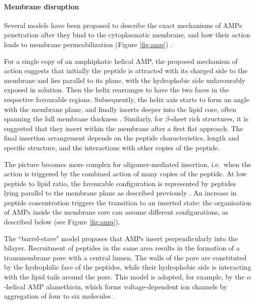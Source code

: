 \paragraph{Membrane disruption} Several models have been proposed to describe the exact mechanisms of AMPs penetration after they bind to the cytoplasmatic membrane, and how their action leads to membrane permeabilization (Figure \ref{fig:amp}) \citep{Brogden2005,Nguyen2011}.

For a single copy of an amphiphatic helical AMP, the proposed mechanism of action suggests that initially the peptide is attracted with its charged side to the membrane and lies parallel to its plane, with the hydrophobic side unfavourably exposed in solution. Then the helix rearranges to have the two faces in the respective favourable regions. Subsequently, the helix axis starts to form an angle with the membrane plane, and finally inserts deeper into the lipid core, often spanning the full membrane thickness \citep{Ebenhan2014}.
%
Similarly, for $\beta$-sheet rich structures, it is suggested that they insert within the membrane after a first flat approach.
%
The final insertion arrangement depends on the peptide characteristics, length and specific structure, and the interactions with other copies of the peptide.

The picture becomes more complex for oligomer-mediated insertion, i.e.\ when the action is triggered by the combined action of many copies of the peptide.
%
At low peptide to lipid ratio, the favourable configuration is represented by peptides lying parallel to the membrane plane as described previously \citep{Yang2001}. An increase in peptide concentration triggers the transition to an inserted state: the organisation of AMPs inside the membrane core can assume different configurations, as described below \citep{Brogden2005,Nguyen2011,Ebenhan2014,Mahlapuu2016} (see Figure \ref{fig:amp}).

The ``barrel-stave" model proposes that AMPs insert perpendicularly into the bilayer.
Recruitment of peptides in the same area results in the formation of a transmembrane pore with a central lumen. The walls of the pore are constituted by the hydrophilic face of the peptides, while their hydrophobic side is interacting with the lipid tails around the pore. This model is adopted, for example, by the $\alpha$-helical AMP alamethicin, which forms voltage-dependent ion channels by aggregation of four to six molecules \citep{Spaar2004}.

